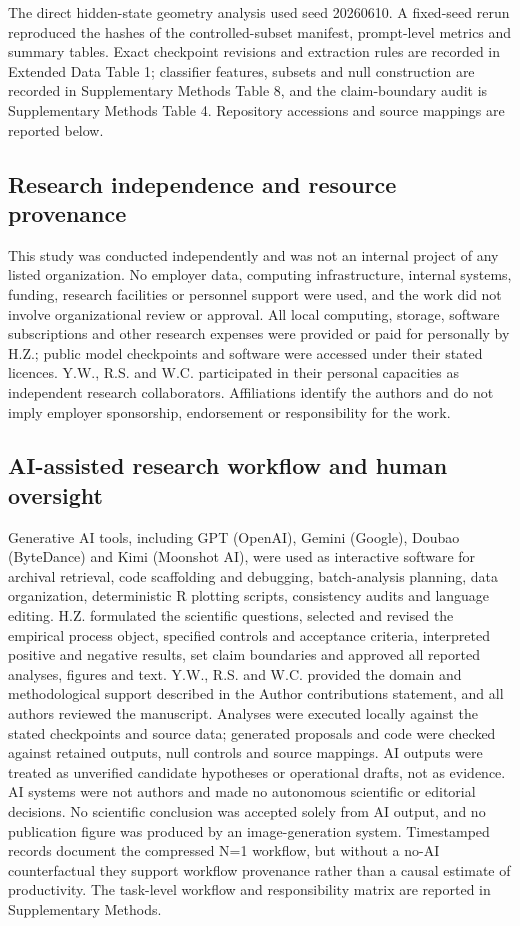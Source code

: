 \documentclass[12pt]{article}
\begin{document}
The direct hidden-state geometry analysis used seed 20260610. A fixed-seed rerun reproduced the hashes of the controlled-subset manifest, prompt-level metrics and summary tables. Exact checkpoint revisions and extraction rules are recorded in Extended Data Table 1; classifier features, subsets and null construction are recorded in Supplementary Methods Table 8, and the claim-boundary audit is Supplementary Methods Table 4. Repository accessions and source mappings are reported below.

\subsection*{Research independence and resource provenance}

This study was conducted independently and was not an internal project of any listed organization. No employer data, computing infrastructure, internal systems, funding, research facilities or personnel support were used, and the work did not involve organizational review or approval. All local computing, storage, software subscriptions and other research expenses were provided or paid for personally by H.Z.; public model checkpoints and software were accessed under their stated licences. Y.W., R.S. and W.C. participated in their personal capacities as independent research collaborators. Affiliations identify the authors and do not imply employer sponsorship, endorsement or responsibility for the work.

\subsection*{AI-assisted research workflow and human oversight}

Generative AI tools, including GPT (OpenAI), Gemini (Google), Doubao (ByteDance) and Kimi (Moonshot AI), were used as interactive software for archival retrieval, code scaffolding and debugging, batch-analysis planning, data organization, deterministic R plotting scripts, consistency audits and language editing. H.Z. formulated the scientific questions, selected and revised the empirical process object, specified controls and acceptance criteria, interpreted positive and negative results, set claim boundaries and approved all reported analyses, figures and text. Y.W., R.S. and W.C. provided the domain and methodological support described in the Author contributions statement, and all authors reviewed the manuscript. Analyses were executed locally against the stated checkpoints and source data; generated proposals and code were checked against retained outputs, null controls and source mappings. AI outputs were treated as unverified candidate hypotheses or operational drafts, not as evidence. AI systems were not authors and made no autonomous scientific or editorial decisions. No scientific conclusion was accepted solely from AI output, and no publication figure was produced by an image-generation system. Timestamped records document the compressed N=1 workflow, but without a no-AI counterfactual they support workflow provenance rather than a causal estimate of productivity. The task-level workflow and responsibility matrix are reported in Supplementary Methods.
\end{document}
